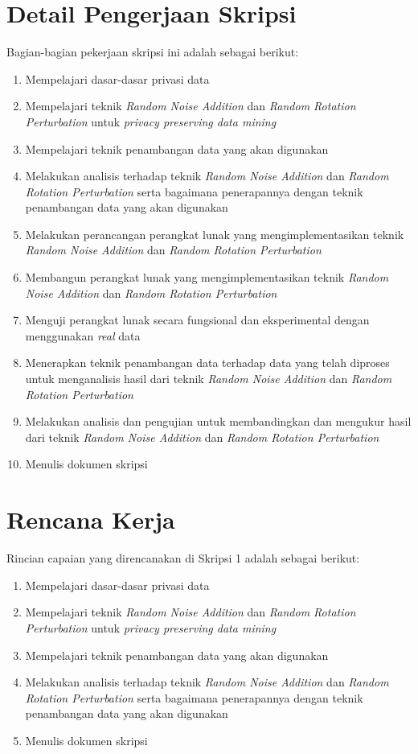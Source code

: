 \documentclass[a4paper,twoside]{article}
\begin{document}
\section{Detail Pengerjaan Skripsi}
Bagian-bagian pekerjaan skripsi ini adalah sebagai berikut:
	\begin{enumerate}
		\item Mempelajari dasar-dasar privasi data
		\item Mempelajari teknik \textit{Random Noise Addition} dan \textit{Random Rotation Perturbation} untuk \textit{privacy preserving data mining}
		\item Mempelajari teknik penambangan data yang akan digunakan
		\item Melakukan analisis terhadap teknik \textit{Random Noise Addition} dan \textit{Random Rotation Perturbation} serta bagaimana penerapannya dengan teknik penambangan data yang akan digunakan
		\item Melakukan perancangan perangkat lunak yang mengimplementasikan teknik \textit{Random Noise Addition} dan \textit{Random Rotation Perturbation}
		\item Membangun perangkat lunak yang mengimplementasikan teknik \textit{Random Noise Addition} dan \textit{Random Rotation Perturbation}
		\item Menguji perangkat lunak secara fungsional dan eksperimental dengan menggunakan \textit{real} data
		\item Menerapkan teknik penambangan data terhadap data yang telah diproses untuk menganalisis hasil dari teknik \textit{Random Noise Addition} dan \textit{Random Rotation Perturbation}
		\item Melakukan analisis dan pengujian untuk membandingkan dan mengukur hasil dari teknik \textit{Random Noise Addition} dan \textit{Random Rotation Perturbation}
		\item Menulis dokumen skripsi
	\end{enumerate}

\section{Rencana Kerja}
Rincian capaian yang direncanakan di Skripsi 1 adalah sebagai berikut:
\begin{enumerate}
	\item Mempelajari dasar-dasar privasi data
	\item Mempelajari teknik \textit{Random Noise Addition} dan \textit{Random Rotation Perturbation} untuk \textit{privacy preserving data mining}
	\item Mempelajari teknik penambangan data yang akan digunakan
	\item Melakukan analisis terhadap teknik \textit{Random Noise Addition} dan \textit{Random Rotation Perturbation} serta bagaimana penerapannya dengan teknik penambangan data yang akan digunakan
	\item Menulis dokumen skripsi
\end{enumerate}
\end{document}

